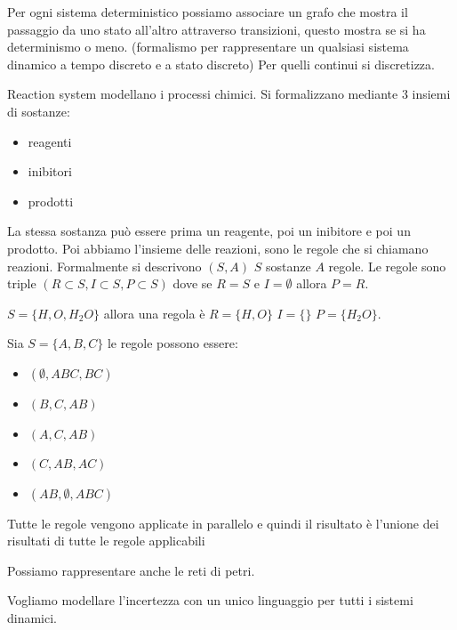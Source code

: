 Per ogni sistema deterministico possiamo associare un grafo che mostra il passaggio 
da uno stato all'altro attraverso transizioni, questo mostra se si ha determinismo 
o meno. (formalismo per rappresentare un qualsiasi sistema dinamico a tempo discreto 
e a stato discreto) Per quelli continui si discretizza.


Reaction system modellano i processi chimici. Si formalizzano mediante $3$ insiemi di sostanze:
\begin{itemize}
    \item reagenti
    \item inibitori
    \item prodotti
\end{itemize}
La stessa sostanza può essere prima un reagente, poi un inibitore e poi un prodotto.
Poi abbiamo l'insieme delle reazioni, sono le regole che si chiamano reazioni.
Formalmente si descrivono $(S,A)$ $S$ sostanze $A$ regole. Le regole sono triple 
$(R\subset S, I\subset S, P\subset S)$ dove se $R=S$ e $I=\emptyset$ allora $P=R$.

\begin{esempio}
    $S=\{H,O,H_2O\}$ allora una regola è $R=\{H,O\}$ $I = \{\}$ $P=\{H_2O\}$.
\end{esempio}

\begin{esempio}
    Sia $S=\{A,B,C\}$ le regole possono essere:
    \begin{itemize}
        \item $(\emptyset, ABC,BC)$
        \item $(B, C,AB)$
        \item $(A, C,AB)$
        \item $(C, AB,AC)$
        \item $(AB, \emptyset,ABC)$
    \end{itemize}
    Tutte le regole vengono applicate in parallelo e quindi il risultato è l'unione 
    dei risultati di tutte le regole applicabili
\end{esempio}

Possiamo rappresentare anche le reti di petri.

Vogliamo modellare l'incertezza con un unico linguaggio per tutti i sistemi dinamici.

